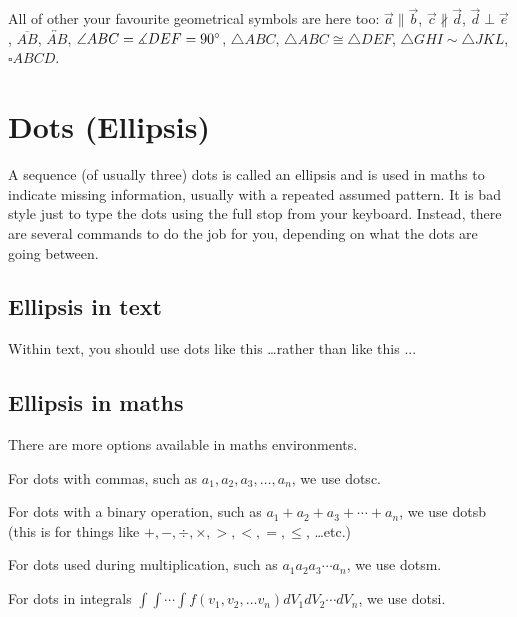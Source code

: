 \documentclass[a4paper,11pt]{article}
\begin{document}
All of other your favourite geometrical symbols are here too:
$ \vec{a} \parallel \vec{b} $, 				%
$ \vec{c} \nparallel \vec{d} $, 			%
$ \vec{d} \perp \vec{e} $, 					%
$ \overline{AB} $, 							%
$ \overleftrightarrow{AB} $, 				%
$ \angle ABC  = \measuredangle DEF = 90\degree $,	%
$ \triangle ABC $, 							%
$ \triangle ABC \cong \triangle DEF $,		%
$ \triangle GHI \sim \triangle JKL $,		%
$ \square ABCD $.  							%

\pagebreak








\section{Dots (Ellipsis)}

A sequence (of usually three) dots is called an ellipsis and is used in maths to indicate missing information, usually with a  repeated assumed pattern. It is bad style just to type the dots using the full stop from your keyboard. Instead, there are several commands to do the job for you, depending on what the dots are going between.

\subsection{Ellipsis in text}
Within text, you should use dots  like this \dots rather than like this ... 

\subsection{Ellipsis in maths}

There are more options available in maths environments.

For dots with commas, such as $a_1,a_2,a_3,\dotsc,a_n$, we use dotsc.

For dots with a binary operation, such as $a_1 + a_2 + a_3 + \dotsb + a_n$, we use dotsb (this is for things like $+, -, \div, \times, >, <, =, \leq$, \dots etc.)

For dots used during multiplication, such as $a_1 a_2 a_3 \dotsm a_n$, we use dotsm.

For dots in integrals $\int \int \dotsi \int f(v_1, v_2, \dotsc v_n) dV_1 dV_2 \dotsm dV_n$, 
we use dotsi.
\end{document}
